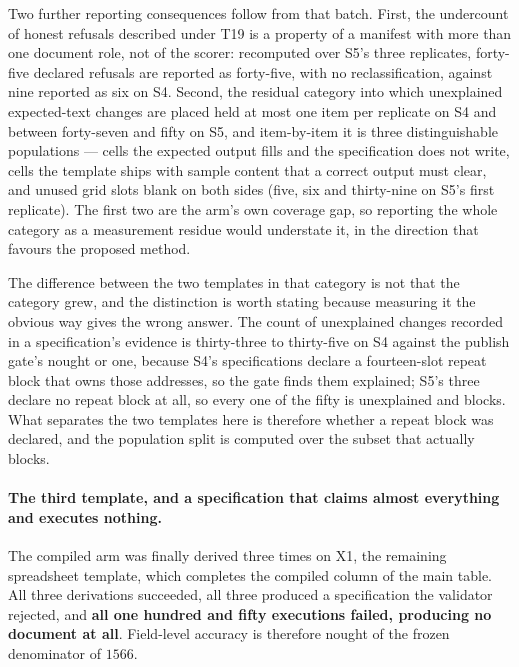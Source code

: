 Two further reporting consequences follow from that batch. First, the undercount of honest
refusals described under T19 is a property of a manifest with more than one document role, not of
the scorer: recomputed over S5's three replicates, forty-five declared refusals are reported as
forty-five, with no reclassification, against nine reported as six on S4. Second, the residual
category into which unexplained expected-text changes are placed held at most one item per
replicate on S4 and between forty-seven and fifty on S5, and item-by-item it is three
distinguishable populations --- cells the expected output fills and the specification does not
write, cells the template ships with sample content that a correct output must clear, and unused
grid slots blank on both sides (five, six and thirty-nine on S5's first replicate). The first two
are the arm's own coverage gap, so reporting the whole category as a measurement residue would
understate it, in the direction that favours the proposed method.

The difference between the two templates in that category is not that the category grew, and the
distinction is worth stating because measuring it the obvious way gives the wrong answer. The
count of unexplained changes recorded in a specification's evidence is thirty-three to thirty-five
on S4 against the publish gate's nought or one, because S4's specifications declare a fourteen-slot
repeat block that owns those addresses, so the gate finds them explained; S5's three declare no
repeat block at all, so every one of the fifty is unexplained and blocks. What separates the two
templates here is therefore whether a repeat block was declared, and the population split is
computed over the subset that actually blocks.

\paragraph{The third template, and a specification that claims almost everything and executes nothing.}
The compiled arm was finally derived three times on X1, the remaining spreadsheet template, which
completes the compiled column of the main table. All three derivations succeeded, all three
produced a specification the validator rejected, and \textbf{all one hundred and fifty executions
failed, producing no document at all}. Field-level accuracy is therefore nought of the frozen
denominator of $1566$.

